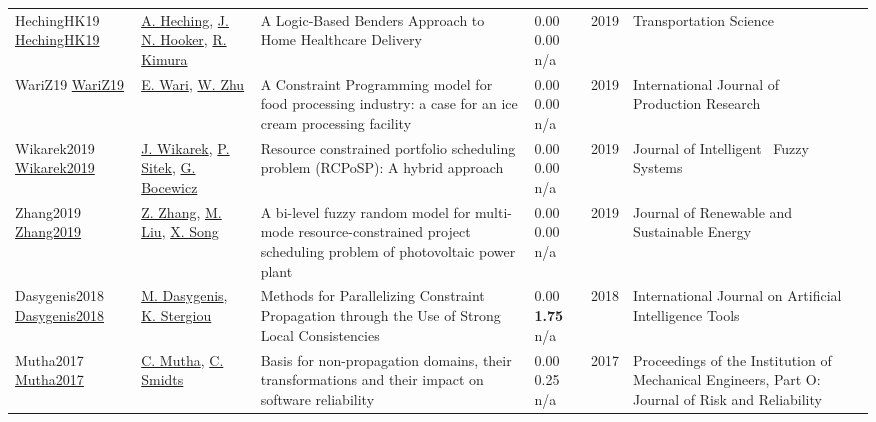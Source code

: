 {\begin{longtable}{p{3cm}p{5cm}p{10cm}p{1cm}rp{2.5cm}l}
HechingHK19 \href{http://dx.doi.org/10.1287/trsc.2018.0830}{HechingHK19} & \hyperref[auth:a1020]{A. Heching}, \hyperref[auth:a160]{J. N. Hooker}, \hyperref[auth:a1021]{R. Kimura} & \cellcolor{gold!20}A Logic-Based Benders Approach to Home Healthcare Delivery & \noindent{}\textcolor{black!50}{0.00} \textcolor{black!50}{0.00} n/a & 2019 & \cellcolor{red!20}Transportation Science & \cite{HechingHK19}\\
WariZ19 \href{http://dx.doi.org/10.1080/00207543.2019.1571250}{WariZ19} & \hyperref[auth:a838]{E. Wari}, \hyperref[auth:a839]{W. Zhu} & A Constraint Programming model for food processing industry: a case for an ice cream processing facility & \noindent{}\textcolor{black!50}{0.00} \textcolor{black!50}{0.00} n/a & 2019 & \cellcolor{red!20}International Journal of Production Research & \cite{WariZ19}\\
Wikarek2019 \href{http://dx.doi.org/10.3233/jifs-179364}{Wikarek2019} & \hyperref[auth:a534]{J. Wikarek}, \hyperref[auth:a1474]{P. Sitek}, \hyperref[auth:a629]{G. Bocewicz} & Resource constrained portfolio scheduling problem (RCPoSP): A hybrid approach & \noindent{}\textcolor{black!50}{0.00} \textcolor{black!50}{0.00} n/a & 2019 & Journal of Intelligent \  Fuzzy Systems & \cite{Wikarek2019}\\
Zhang2019 \href{http://dx.doi.org/10.1063/1.5053623}{Zhang2019} & \hyperref[auth:a1742]{Z. Zhang}, \hyperref[auth:a1743]{M. Liu}, \hyperref[auth:a1744]{X. Song} & A bi-level fuzzy random model for multi-mode resource-constrained project scheduling problem of photovoltaic power plant & \noindent{}\textcolor{black!50}{0.00} \textcolor{black!50}{0.00} n/a & 2019 & Journal of Renewable and Sustainable Energy & \cite{Zhang2019}\\
Dasygenis2018 \href{http://dx.doi.org/10.1142/s0218213018600023}{Dasygenis2018} & \hyperref[auth:a1997]{M. Dasygenis}, \hyperref[auth:a1998]{K. Stergiou} & Methods for Parallelizing Constraint Propagation through the Use of Strong Local Consistencies & \noindent{}\textcolor{black!50}{0.00} \textbf{1.75} n/a & 2018 & International Journal on Artificial Intelligence Tools & \cite{Dasygenis2018}\\
Mutha2017 \href{http://dx.doi.org/10.1177/1748006x17744380}{Mutha2017} & \hyperref[auth:a1954]{C. Mutha}, \hyperref[auth:a1955]{C. Smidts} & Basis for non-propagation domains, their transformations and their impact on software reliability & \noindent{}\textcolor{black!50}{0.00} 0.25 n/a & 2017 & Proceedings of the Institution of Mechanical Engineers, Part O: Journal of Risk and Reliability & \cite{Mutha2017}\\

\end{longtable}}
